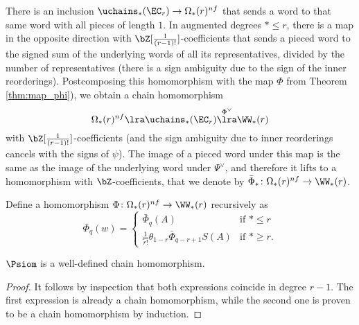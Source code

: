 There is an inclusion $\uchains_*(\EC_r)\to \Omega_*(r)^{nf}$ that sends a word to that same word with all pieces of length $1$. In augmented degrees $*\leq r$, there is a map in the opposite direction with $\bZ[\frac{1}{(r-1)!}]$-coefficients that sends a pieced word to the signed sum of the underlying words of all its representatives, divided by the number of representatives (there is a sign ambiguity due to the sign of the inner reorderings). Postcomposing this homomorphism with the map $\Phi$ from Theorem \ref{thm:map_phi}), we obtain a chain homomorphism
\begin{equation} \label{eq:234}
	\Omega_*(r)^{nf}\lra \uchains_*(\EC_r)\overset{\Phi^\vee}{\lra} \WW_*(r)
\end{equation}
with $\bZ[\frac{1}{(r-1)!}]$-coefficients (and the sign ambiguity due to inner reorderings cancels with the signs of $\psi$). The image of a pieced word under this map is the same as the image of the underlying word under $\Psi^\vee$, and therefore it lifts to a homomorphism with $\bZ$-coefficients, that we denote by $\bar{\Phi}_*\colon \Omega_*(r)^{nf}\to \WW_*(r)$.

\begin{definition}
	Define a homomorphism $\Phi\colon \Omega_*(r)^{nf}\to \WW_*(r)$ recursively as
	\[\Phi_q(w) = \begin{cases} \bar{\Phi}_q(A) & \text{if $*\leq r$} \\
		\frac{1}{\tilde{r}!}\theta_{1-r}\bar{\Phi}_{q-r+1}S(A) & \text{if $*\geq r$.}\end{cases}\]
\end{definition}

\begin{lemma}
	$\Psiom$ is a well-defined chain homomorphism. %
\end{lemma}

\begin{proof}
It follows by inspection that both expressions coincide in degree $r-1$. The first expression is already a chain homomorphism, while the second one is proven to be a chain homomorphism by induction.
\end{proof}

